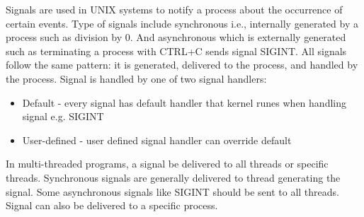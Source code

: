 \documentclass[a4paper]{article}
\theoremstyle{plain}
\theoremstyle{definition}
\newtheorem{defn}{Definition}[section]
\theoremstyle{remark}
\begin{document}
\begin{tcolorbox}[colback=black!3!white,colframe=black!60!white,title=\begin{defn}Signal Handling \label{Signal Handling}\end{defn}]
Signals are used in UNIX systems to notify a process about the occurrence of certain events. Type of signals include synchronous i.e., internally generated by a process such as division by $0$. And asynchronous which is externally generated such as terminating a process with CTRL+C sends signal SIGINT. All signals follow the same pattern: it is generated, delivered to the process, and handled by the process. Signal is handled by one of two signal handlers:
\begin{itemize}
	\item Default - every signal has default handler that kernel runes when handling signal e.g. SIGINT
	\item User-defined - user defined signal handler can override default
\end{itemize}
In multi-threaded programs, a signal be delivered to all threads or specific threads. Synchronous signals are generally delivered to thread generating the signal. Some asynchronous signals like SIGINT should be sent to all threads. Signal can also be delivered to a specific process.
\end{tcolorbox}
\end{document}
